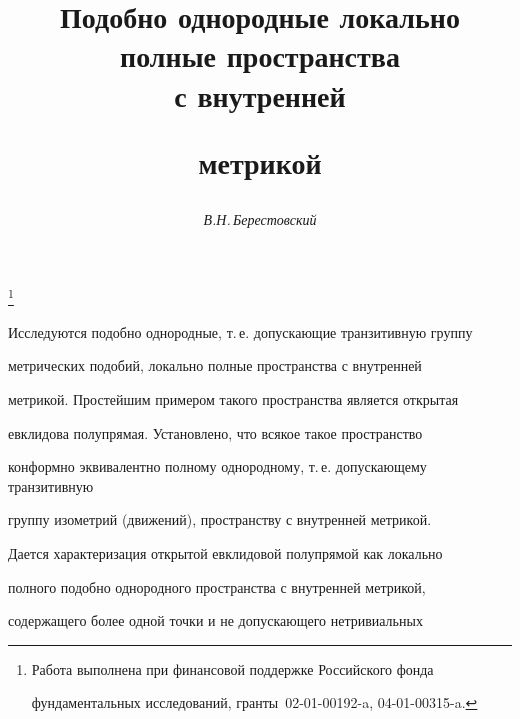 






\author{\it В.Н.\,Берестовский}




\title{Подобно однородные локально полные пространства\\ с внутренней


метрикой}


\thanks{Работа выполнена при финансовой поддержке Российского фонда


фундаментальных исследований, гранты \No\No\,02-01-00192-a, 04-01-00315-a.}





\date{}




\pagestyle{plain} %







\maketitle


\label{begin}





Исследуются подобно однородные, т.\,е. допускающие транзитивную группу 


метрических подобий, локально полные пространства с внутренней 


метрикой. Простейшим примером такого пространства является открытая 


евклидова полупрямая. Установлено, что всякое такое пространство 


конформно эквивалентно полному однородному, т.\,е. допускающему транзитивную 


группу изометрий (движений), пространству с внутренней метрикой. 


Дается характеризация открытой евклидовой полупрямой как локально 


полного подобно однородного пространства с внутренней метрикой, 


содержащего более одной точки и не допускающего нетривиальных


